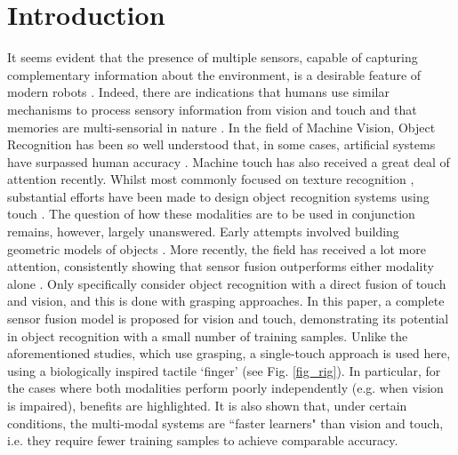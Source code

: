 \documentclass[9pt,technote]{IEEEtran}  %
\begin{document}
\section{Introduction}
It seems evident that the presence of multiple sensors, capable of capturing complementary information about the environment, is a desirable feature of modern robots \cite{Kim2004,Gorges2010}. Indeed, there are indications that humans use similar mechanisms to process sensory information from vision and touch and that memories are multi-sensorial in nature \cite{Lacey2007,Vasconcelos2011,Lacey2014}.
In the field of Machine Vision, Object Recognition has been so well understood that, in some cases, artificial systems have surpassed human accuracy \cite{He2015}.
Machine touch has also received a great deal of attention recently. Whilst most commonly focused on texture recognition \cite{Decherchi2011,Jamali2011,Liu2012,Sinapov2011}, substantial efforts have been made to design object recognition systems using touch \cite{Navarro2012,Soh2012,Madry2014}. 
The question of how these modalities are to be used in conjunction remains, however, largely unanswered. Early attempts involved building geometric models of objects \cite{Allen1988}. More recently, the field has received a lot more attention, consistently showing that sensor fusion outperforms either modality alone \cite{Kim2004,Ilonen2013,Guler2014,Yang2015}. Only \cite{Kim2004,Yang2015} specifically consider object recognition with a direct fusion of touch and vision, and this is done with grasping approaches. 
In this paper, a complete sensor fusion model is proposed for vision and touch, demonstrating its potential in object recognition with a small number of training samples. Unlike the aforementioned studies, which use grasping, a single-touch approach is used here, using a biologically inspired tactile `finger' (see Fig. \ref{fig_rig}). In particular, for the cases where both modalities perform poorly independently (e.g. when vision is impaired), benefits are highlighted. It is also shown that, under certain conditions, the multi-modal systems are ``faster learners" than vision and touch, i.e. they require fewer training samples to achieve comparable accuracy.

\begin{figure}
\centering
{}	
\end{figure}
\end{document}
